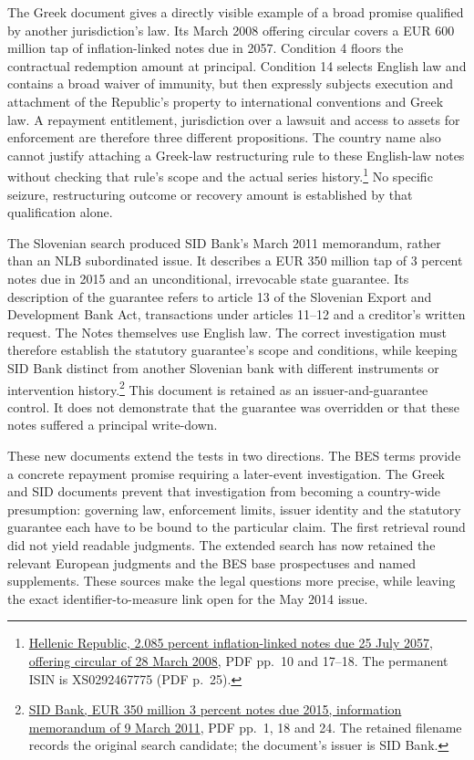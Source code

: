 The Greek document gives a directly visible example of a broad promise
qualified by another jurisdiction's law. Its March 2008 offering circular
covers a EUR 600 million tap of inflation-linked notes due in 2057.
Condition 4 floors the contractual redemption amount at principal.
Condition 14 selects English law and contains a broad waiver of immunity,
but then expressly subjects execution and attachment of the Republic's
property to international conventions and Greek law. A repayment entitlement,
jurisdiction over a lawsuit and access to assets for enforcement are therefore
three different propositions. The country name also cannot justify attaching
a Greek-law restructuring rule to these English-law notes without checking
that rule's scope and the actual series history.\footnote{
\href{../prospectus/jurisdiction-2026-10-04/sources/jur-hellenic-2008-candidate/source.pdf}
{Hellenic Republic, 2.085 percent inflation-linked notes due 25 July 2057,
offering circular of 28 March 2008}, PDF pp.~10 and 17--18.
The permanent ISIN is XS0292467775 (PDF p.~25).}
No specific seizure, restructuring outcome or recovery amount is established
by that qualification alone.

The Slovenian search produced SID Bank's March 2011 memorandum, rather than
an NLB subordinated issue. It describes a EUR 350 million tap of 3 percent
notes due in 2015 and an unconditional, irrevocable state guarantee. Its
description of the guarantee refers to article 13 of the Slovenian Export
and Development Bank Act, transactions under articles 11--12 and a creditor's
written request. The Notes themselves use English law. The correct
investigation must therefore establish the statutory guarantee's scope and
conditions, while keeping SID Bank distinct from another Slovenian bank
with different instruments or intervention history.\footnote{
\href{../prospectus/jurisdiction-2026-10-04/sources/jur-nlb-2011-candidate/source.pdf}
{SID Bank, EUR 350 million 3 percent notes due 2015, information memorandum
of 9 March 2011}, PDF pp.~1, 18 and 24. The retained filename records the
original search candidate; the document's issuer is SID Bank.}
This document is retained as an issuer-and-guarantee control. It does not
demonstrate that the guarantee was overridden or that these notes suffered
a principal write-down.

These new documents extend the tests in two directions. The BES terms
provide a concrete repayment promise requiring a later-event investigation.
The Greek and SID documents prevent that investigation from becoming a
country-wide presumption: governing law, enforcement limits, issuer identity
and the statutory guarantee each have to be bound to the particular claim.
The first retrieval round did not yield readable judgments. The extended
search has now retained the relevant European judgments and the BES base
prospectuses and named supplements. These sources make the legal questions
more precise, while leaving the exact identifier-to-measure link open for
the May 2014 issue.



